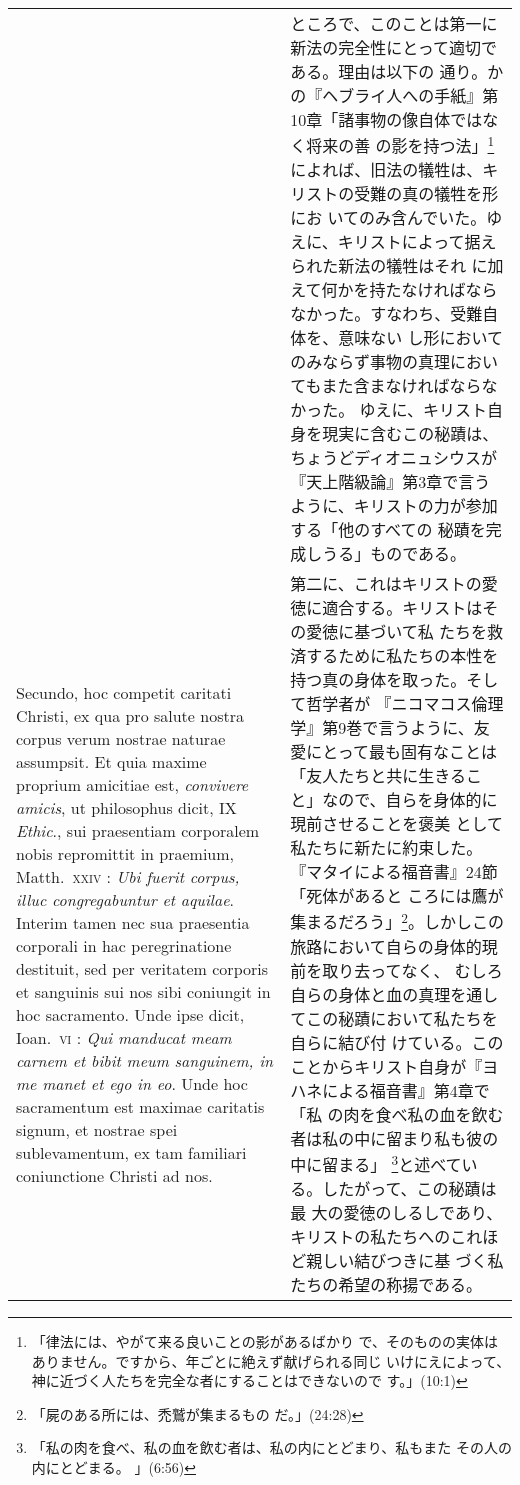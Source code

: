 \documentclass[10pt]{jsarticle} %
\begin{document}
\begin{longtable}{p{21em}p{21em}}
&

ところで、このことは第一に新法の完全性にとって適切である。理由は以下の
通り。かの『ヘブライ人への手紙』第10章「諸事物の像自体ではなく将来の善
の影を持つ法」\footnote{「律法には、やがて来る良いことの影があるばかり
で、そのものの実体はありません。ですから、年ごとに絶えず献げられる同じ
いけにえによって、神に近づく人たちを完全な者にすることはできないので
す。」(10:1)}によれば、旧法の犠牲は、キリストの受難の真の犠牲を形にお
いてのみ含んでいた。ゆえに、キリストによって据えられた新法の犠牲はそれ
に加えて何かを持たなければならなかった。すなわち、受難自体を、意味ない
し形においてのみならず事物の真理においてもまた含まなければならなかった。
ゆえに、キリスト自身を現実に含むこの秘蹟は、ちょうどディオニュシウスが
『天上階級論』第3章で言うように、キリストの力が参加する「他のすべての
秘蹟を完成しうる」ものである。


\\


Secundo, hoc competit caritati Christi, ex qua pro salute nostra
corpus verum nostrae naturae assumpsit. Et quia maxime proprium
amicitiae est, {\itshape convivere amicis}, ut philosophus dicit, IX
{\itshape Ethic}., sui praesentiam corporalem nobis repromittit in
praemium, Matth.~{\scshape xxiv} : {\itshape Ubi fuerit corpus, illuc
congregabuntur et aquilae}. Interim tamen nec sua praesentia corporali
in hac peregrinatione destituit, sed per veritatem corporis et
sanguinis sui nos sibi coniungit in hoc sacramento. Unde ipse dicit,
Ioan.~{\scshape vi} : {\itshape Qui manducat meam carnem et bibit meum
sanguinem, in me manet et ego in eo}. Unde hoc sacramentum est maximae
caritatis signum, et nostrae spei sublevamentum, ex tam familiari
coniunctione Christi ad nos.


&

第二に、これはキリストの愛徳に適合する。キリストはその愛徳に基づいて私
たちを救済するために私たちの本性を持つ真の身体を取った。そして哲学者が
『ニコマコス倫理学』第9巻で言うように、友愛にとって最も固有なことは
「友人たちと共に生きること」なので、自らを身体的に現前させることを褒美
として私たちに新たに約束した。『マタイによる福音書』24節「死体があると
ころには鷹が集まるだろう」\footnote{「屍のある所には、禿鷲が集まるもの
だ。」(24:28)}。しかしこの旅路において自らの身体的現前を取り去ってなく、
むしろ自らの身体と血の真理を通してこの秘蹟において私たちを自らに結び付
けている。このことからキリスト自身が『ヨハネによる福音書』第4章で「私
の肉を食べ私の血を飲む者は私の中に留まり私も彼の中に留まる」
\footnote{「私の肉を食べ、私の血を飲む者は、私の内にとどまり、私もまた
その人の内にとどまる。 」(6:56)}と述べている。したがって、この秘蹟は最
大の愛徳のしるしであり、キリストの私たちへのこれほど親しい結びつきに基
づく私たちの希望の称揚である。




\end{longtable}
\end{document}
